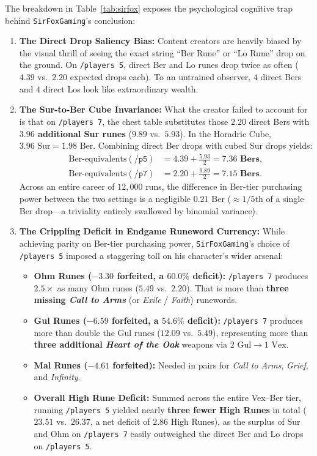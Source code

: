 \documentclass[11pt,reqno]{amsart}
\theoremstyle{definition}
\begin{document}
The breakdown in Table~\ref{tab:sirfox} exposes the psychological cognitive trap behind \texttt{SirFoxGaming}'s conclusion:
\begin{enumerate}
    \item \textbf{The Direct Drop Saliency Bias:} Content creators are heavily biased by the visual thrill of seeing the exact string ``Ber Rune'' or ``Lo Rune'' drop on the ground. On \texttt{/players~5}, direct Ber and Lo runes drop twice as often ($4.39$ vs.\ $2.20$ expected drops each). To an untrained observer, $4$ direct Bers and $4$ direct Los look like extraordinary wealth.
    \item \textbf{The Sur-to-Ber Cube Invariance:} What the creator failed to account for is that on \texttt{/players~7}, the chest table substitutes those $2.20$ direct Bers with \textbf{$3.96$ additional Sur runes} ($9.89$ vs.\ $5.93$). In the Horadric Cube, $3.96\text{ Sur} = 1.98\text{ Ber}$. Combining direct Ber drops with cubed Sur drops yields:
    \begin{align*}
        \text{Ber-equivalents}(\texttt{/p5}) &= 4.39 + \frac{5.93}{2} = \mathbf{7.36\text{ Bers}}, \\
        \text{Ber-equivalents}(\texttt{/p7}) &= 2.20 + \frac{9.89}{2} = \mathbf{7.15\text{ Bers}}.
    \end{align*}
    Across an entire career of $12{,}000$ runs, the difference in Ber-tier purchasing power between the two settings is a negligible $0.21\text{ Ber}$ ($\approx 1/5\text{th}$ of a single Ber drop—a triviality entirely swallowed by binomial variance).
    \item \textbf{The Crippling Deficit in Endgame Runeword Currency:} While achieving parity on Ber-tier purchasing power, \texttt{SirFoxGaming}'s choice of \texttt{/players~5} imposed a staggering toll on his character's wider arsenal:
    \begin{itemize}
        \item \textbf{Ohm Runes ($-3.30$ forfeited, a $60.0\%$ deficit):} \texttt{/players~7} produces $2.5\times$ as many Ohm runes ($5.49$ vs.\ $2.20$). That is more than \textbf{three missing \emph{Call to Arms}} (or \emph{Exile} / \emph{Faith}) runewords.
        \item \textbf{Gul Runes ($-6.59$ forfeited, a $54.6\%$ deficit):} \texttt{/players~7} produces more than double the Gul runes ($12.09$ vs.\ $5.49$), representing more than \textbf{three additional \emph{Heart of the Oak}} weapons via $2\text{ Gul} \to 1\text{ Vex}$.
        \item \textbf{Mal Runes ($-4.61$ forfeited):} Needed in pairs for \emph{Call to Arms}, \emph{Grief}, and \emph{Infinity}.
        \item \textbf{Overall High Rune Deficit:} Summed across the entire Vex--Ber tier, running \texttt{/players~5} yielded nearly \textbf{three fewer High Runes} in total ($23.51$ vs.\ $26.37$, a net deficit of $2.86$ High Runes), as the surplus of Sur and Ohm on \texttt{/players~7} easily outweighed the direct Ber and Lo drops on \texttt{/players~5}.
    \end{itemize}
\end{enumerate}
\end{document}

